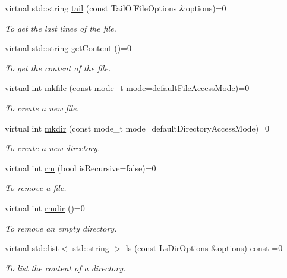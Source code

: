 \begin{DoxyCompactItemize}
virtual std::string \hyperlink{classFile_ab42e1acabd8cf2126590b268adb60952}{tail} (const TailOfFileOptions \&options)=0
\begin{DoxyCompactList}\small\item\em To get the last lines of the file. \item\end{DoxyCompactList}\item 
virtual std::string \hyperlink{classFile_a4b5a13754b6a7a77b50b18ffdeb496b4}{getContent} ()=0
\begin{DoxyCompactList}\small\item\em To get the content of the file. \item\end{DoxyCompactList}\item 
virtual int \hyperlink{classFile_ad61fdb89f84856e17abb7b7f537cd4f3}{mkfile} (const mode\_\-t mode=defaultFileAccessMode)=0
\begin{DoxyCompactList}\small\item\em To create a new file. \item\end{DoxyCompactList}\item 
virtual int \hyperlink{classFile_a44f6ee1c94813f1b4b6f8cca880a3dce}{mkdir} (const mode\_\-t mode=defaultDirectoryAccessMode)=0
\begin{DoxyCompactList}\small\item\em To create a new directory. \item\end{DoxyCompactList}\item 
virtual int \hyperlink{classFile_ab293f14b29c227c87ae03ad2ce3e605b}{rm} (bool isRecursive=false)=0
\begin{DoxyCompactList}\small\item\em To remove a file. \item\end{DoxyCompactList}\item 
virtual int \hyperlink{classFile_a7789c3c8671dbdff8b8dfe2cabeaf433}{rmdir} ()=0
\begin{DoxyCompactList}\small\item\em To remove an empty directory. \item\end{DoxyCompactList}\item 
virtual std::list$<$ std::string $>$ \hyperlink{classFile_a8f0d0fb350e9587914c648597ebf7343}{ls} (const LsDirOptions \&options) const =0
\begin{DoxyCompactList}\small\item\em To list the content of a directory. \item\end{DoxyCompactList}\item 

\end{DoxyCompactItemize}
